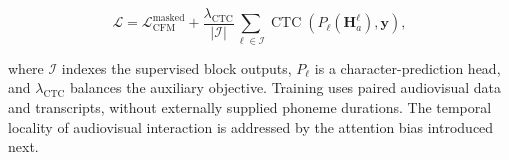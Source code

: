 \begin{equation}
\mathcal{L}
=
\mathcal{L}_{\mathrm{CFM}}^{\mathrm{masked}}
+
\frac{\lambda_{\mathrm{CTC}}}{|\mathcal{I}|}
\sum_{\ell\in\mathcal{I}}
\operatorname{CTC}
\left(
P_\ell(\mathbf{H}_a^\ell),\mathbf{y}
\right),
\label{eq:training_objective}
\end{equation}

where \(\mathcal{I}\) indexes the supervised block outputs, \(P_\ell\) is a character-prediction head, and \(\lambda_{\mathrm{CTC}}\) balances the auxiliary objective. Training uses paired audiovisual data and transcripts, without externally supplied phoneme durations. The temporal locality of audiovisual interaction is addressed by the attention bias introduced next.
